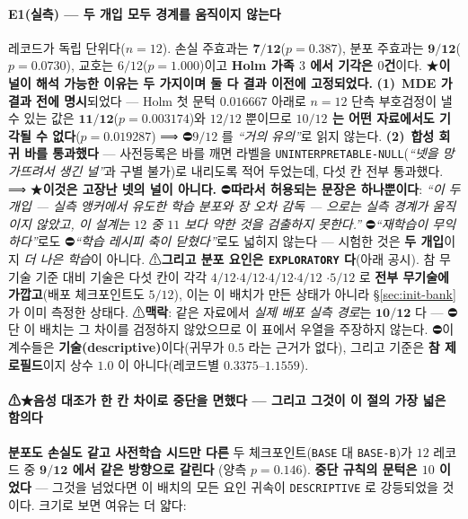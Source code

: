\documentclass[11pt]{report}
\numberwithin{equation}{chapter}
\numberwithin{figure}{chapter}
\numberwithin{table}{chapter}
\begin{document}
\paragraph{E1(실측) --- 두 개입 모두 경계를 움직이지 않는다}
레코드가 독립 단위다($n = 12$). 손실 주효과는 $\mathbf{7/12}$($p = 0.387$), 분포 주효과는
$\mathbf{9/12}$($p = \mathbf{0.0730}$), 교호는 $6/12$($p = 1.000$)이고 \textbf{Holm 가족
$3$ 에서 기각은 $0$건}이다.
★\textbf{이 널이 해석 가능한 이유는 두 가지이며 둘 다 결과 이전에 고정되었다.}
\textbf{(1)}~\textbf{MDE 가 결과 전에 명시}되었다 --- Holm 첫 문턱 $0.016667$ 아래로
$n = 12$ 단측 부호검정이 낼 수 있는 값은 $\mathbf{11/12}$($p = 0.003174$)와 $12/12$ 뿐이므로
\textbf{$10/12$ 는 어떤 자료에서도 기각될 수 없다}($p = 0.019287$) ⟹ ⛔$9/12$ 를
\emph{``거의 유의''}로 읽지 않는다. \textbf{(2)}~\textbf{합성 회귀 바를 통과했다} --- 사전등록은
바를 깨면 라벨을 \texttt{UNINTERPRETABLE-NULL}(\emph{``넷을 망가뜨려서 생긴 널''}과 구별
불가)로 내리도록 적어 두었는데, 다섯 칸 전부 통과했다. ⟹ ★\textbf{이것은 고장난 넷의 널이
아니다.}
⛔\textbf{따라서 허용되는 문장은 하나뿐이다}: \emph{``이 두 개입 --- 실측 앵커에서 유도한
학습 분포와 장 오차 감독 --- 으로는 실측 경계가 움직이지 않았고, 이 설계는 $12$ 중 $11$ 보다
약한 것을 검출하지 못한다.''} ⛔\emph{``재학습이 무익하다''}로도 ⛔\emph{``학습 레시피 축이
닫혔다''}로도 넓히지 않는다 --- 시험한 것은 \textbf{두 개입}이지 \emph{더 나은 학습}이 아니다.
⚠\textbf{그리고 분포 요인은 \texttt{EXPLORATORY} 다}(아래 공시).
참 무기술 기준 대비 기술은 다섯 칸이 각각 $4/12$$\cdot$$4/12$$\cdot$$4/12$$\cdot$$4/12$
$\cdot$$5/12$ 로 \textbf{전부 무기술에 가깝고}(배포 체크포인트도 $5/12$), 이는 이 배치가
만든 상태가 아니라 \S\ref{sec:init-bank} 가 이미 측정한 상태다.
⚠\textbf{맥락}: 같은 자료에서 \emph{실제 배포 실측 경로}는 $\mathbf{10/12}$ 다 --- ⛔단 이
배치는 그 차이를 검정하지 않았으므로 이 표에서 우열을 주장하지 않는다.
⛔이 계수들은 \textbf{기술(descriptive)}이다(귀무가 $0.5$ 라는 근거가 없다), 그리고 기준은
\textbf{참 제로필드}이지 상수 $1.0$ 이 아니다(레코드별 $0.3375$--$1.1559$).

\paragraph{⚠★음성 대조가 한 칸 차이로 중단을 면했다 --- 그리고 그것이 이 절의 가장 넓은 함의다}
\textbf{분포도 손실도 같고 사전학습 시드만 다른} 두 체크포인트(\texttt{BASE} 대
\texttt{BASE-B})가 $12$ 레코드 중 \textbf{$\mathbf{9/12}$ 에서 같은 방향으로 갈린다}
(양측 $p = 0.146$). \textbf{중단 규칙의 문턱은 $10$ 이었다} --- 그것을 넘었다면 이 배치의
모든 요인 귀속이 \texttt{DESCRIPTIVE} 로 강등되었을 것이다. 크기로 보면 여유는 더 얇다:
\end{document}
